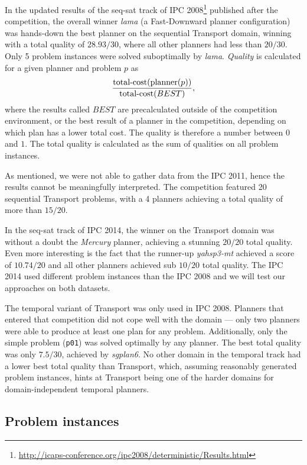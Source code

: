 
In the updated results of the seq-sat track of IPC 2008\footnote{\url{http://icaps-conference.org/ipc2008/deterministic/Results.html}} published after the competition,
the overall winner \textit{lama} (a Fast-Downward  planner configuration)
was hands-down the best planner on the sequential Transport domain, winning
with a total quality of $28.93/30$, where all other planners had less than $20/30$.
Only 5 problem instances were solved suboptimally by \textit{lama}.
\textit{Quality} is calculated for a given planner and problem $p$
as $$\frac{\textrm{total-cost}(\textrm{planner}(p))}{\textrm{total-cost}(BEST)},$$ where the results called $BEST$
are precalculated outside of the competition environment, or the best result of a planner in the competition, depending on which plan has a lower total cost. The quality is therefore a number between $0$ and $1$. The total quality is calculated as the sum of qualities on all problem instances.

As mentioned, we were not able to gather data from the IPC 2011,
hence the results cannot be meaningfully interpreted.
The competition featured 20 sequential Transport problems,
with a 4 planners achieving a total quality of more than $15/20$.

In the seq-sat track of IPC 2014, the winner on the Transport domain
was without a doubt the \textit{Mercury} planner, achieving
a stunning $20/20$ total quality. Even more interesting is the fact that
the runner-up \textit{yahsp3-mt} achieved a score of $10.74/20$
and all other planners achieved sub $10/20$ total quality.
The IPC 2014 used different problem instances than the IPC 2008
and we will test our approaches on both datasets.

The temporal variant of Transport was only used in IPC 2008.
Planners that entered that competition did not cope well with the domain
--- only two  planners were able to produce at least one plan
for any problem. Additionally, only the simple problem (\verb+p01+) was solved
optimally by any planner. The best total quality was only $7.5/30$, achieved by
\textit{sgplan6}. No other domain in the temporal track had a lower best total quality
than Transport, which, assuming reasonably generated problem instances, hints
at Transport being one of the harder domains for domain-independent temporal planners.

\subsection{Problem instances}


